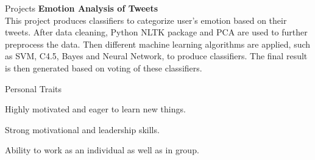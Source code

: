 \documentclass{resume} %
\begin{document}
\begin{rSection}{Projects}
{\bf Emotion Analysis of Tweets}\\%
This project produces classifiers to categorize user's emotion based on their tweets.
After data cleaning, Python NLTK package and PCA are used to further preprocess the data. 
Then different machine learning algorithms are applied, such as 
SVM, C4.5, Bayes and Neural Network, to produce classifiers.
The final result is then generated based on voting of these classifiers.

\end{rSection}



\begin{rSection}{Personal Traits}
\item Highly motivated and eager to learn new things.
\item Strong motivational and leadership skills.
\item Ability to work as an individual as well as in group.
\end{rSection}
\end{document}
